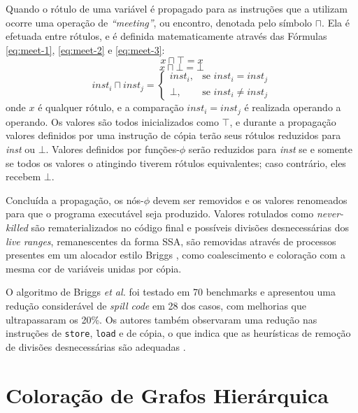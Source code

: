 \documentclass[
	12pt,				%
	openright,			%
	twoside,			%
	a4paper,			%
	tcc,			%
	]{ABNT-DC-UEL}
\begin{document}
Quando o rótulo de uma variável é propagado para as instruções que a utilizam ocorre uma operação de \textit{``meeting''}, ou encontro, denotada pelo símbolo $\sqcap$. Ela é efetuada entre rótulos, e é definida matematicamente através das Fórmulas \ref{eq:meet-1}, \ref{eq:meet-2} e \ref{eq:meet-3}:
\begin{equation}
    x \sqcap \top = x
    \label{eq:meet-1}
\end{equation}
\begin{equation}
    x \sqcap \bot = \bot
    \label{eq:meet-2}
\end{equation}
\begin{equation}
    \mathit{inst}_i \sqcap \mathit{inst}_j = 
    \begin{cases}
        \mathit{inst}_i, & \text{se } \mathit{inst}_i = \mathit{inst}_j \\
        \bot, & \text{se } \mathit{inst}_i \ne \mathit{inst}_j
    \end{cases}
    \label{eq:meet-3}
\end{equation}
onde $x$ é qualquer rótulo, e a comparação $\mathit{inst}_i = \textit{inst}_j$ é realizada operando a operando. Os valores são todos inicializados como $\top$, e durante a propagação valores definidos por uma instrução de cópia terão seus rótulos reduzidos para \textit{inst} ou $\bot$. Valores definidos por funções-$\phi$ serão reduzidos para \textit{inst} se e somente se todos os valores o atingindo tiverem rótulos equivalentes; caso contrário, eles recebem $\bot$.

Concluída a propagação, os nós-$\phi$ devem ser removidos e os valores renomeados para que o programa executável seja produzido. Valores rotulados como \textit{never-killed} são rematerializados no código final e possíveis divisões desnecessárias dos \textit{live ranges}, remanescentes da forma SSA, são removidas através de processos presentes em um alocador estilo Briggs \cite{briggs:92}, como coalescimento e coloração com a mesma cor de variáveis unidas por cópia.

O algoritmo de Briggs \textit{et al.} foi testado em 70 benchmarks e apresentou uma redução considerável de \textit{spill code} em 28 dos casos, com melhorias que ultrapassaram os 20\%. Os autores também observaram uma redução nas instruções de \texttt{store}, \texttt{load} e de cópia, o que indica que as heurísticas de remoção de divisões desnecessárias são adequadas \cite{briggs2:92}.

\section{Coloração de Grafos Hierárquica}
\end{document}

